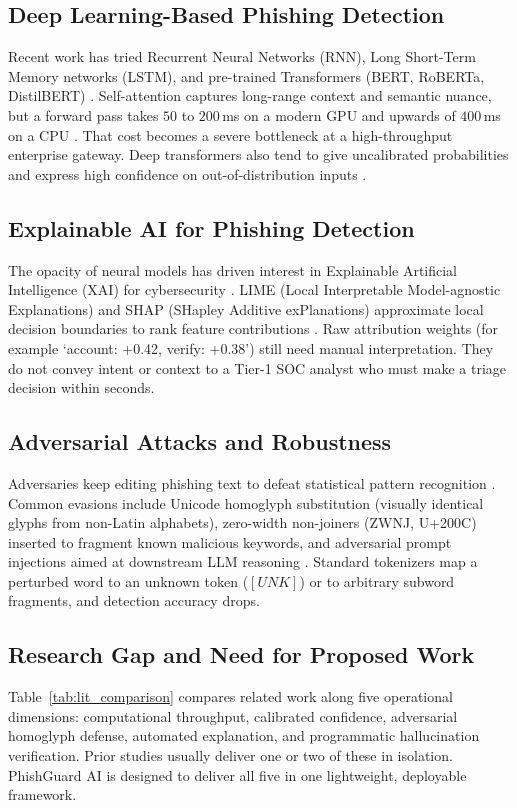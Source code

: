 \documentclass[conference]{IEEEtran}
\begin{document}
\subsection{Deep Learning-Based Phishing Detection}
Recent work has tried Recurrent Neural Networks (RNN), Long Short-Term Memory networks (LSTM), and pre-trained Transformers (BERT, RoBERTa, DistilBERT) \cite{almoqren2024,lee2020}. Self-attention captures long-range context and semantic nuance, but a forward pass takes $50$ to $200$\,ms on a modern GPU and upwards of $400$\,ms on a CPU \cite{salloum2021}. That cost becomes a severe bottleneck at a high-throughput enterprise gateway. Deep transformers also tend to give uncalibrated probabilities and express high confidence on out-of-distribution inputs \cite{guo2017}.

\subsection{Explainable AI for Phishing Detection}
The opacity of neural models has driven interest in Explainable Artificial Intelligence (XAI) for cybersecurity \cite{arrieta2020}. LIME (Local Interpretable Model-agnostic Explanations) and SHAP (SHapley Additive exPlanations) approximate local decision boundaries to rank feature contributions \cite{ribeiro2016,lundberg2017}. Raw attribution weights (for example `account: +0.42, verify: +0.38') still need manual interpretation. They do not convey intent or context to a Tier-1 SOC analyst who must make a triage decision within seconds.

\subsection{Adversarial Attacks and Robustness}
Adversaries keep editing phishing text to defeat statistical pattern recognition \cite{dhamija2006}. Common evasions include Unicode homoglyph substitution (visually identical glyphs from non-Latin alphabets), zero-width non-joiners (ZWNJ, U+200C) inserted to fragment known malicious keywords, and adversarial prompt injections aimed at downstream LLM reasoning \cite{grosse2017,perez2022}. Standard tokenizers map a perturbed word to an unknown token ($[UNK]$) or to arbitrary subword fragments, and detection accuracy drops.

\subsection{Research Gap and Need for Proposed Work}
Table~\ref{tab:lit_comparison} compares related work along five operational dimensions: computational throughput, calibrated confidence, adversarial homoglyph defense, automated explanation, and programmatic hallucination verification. Prior studies usually deliver one or two of these in isolation. PhishGuard AI is designed to deliver all five in one lightweight, deployable framework.
\end{document}
